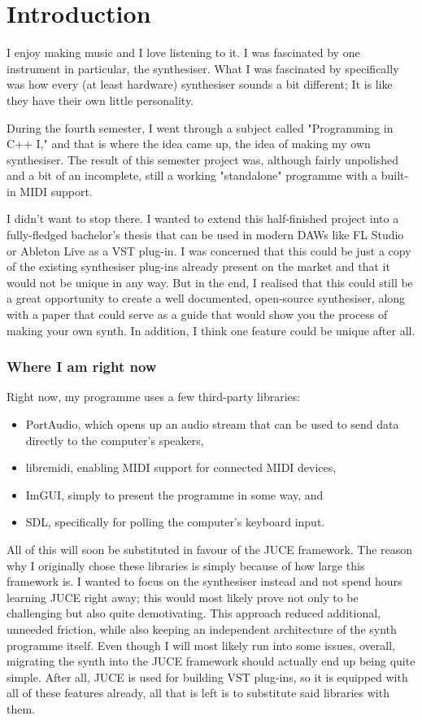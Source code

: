 \chapter{Introduction}
\label{sec:Introduction}

I enjoy making music and I love listening to it. I was fascinated by one instrument in particular, the synthesiser. What I was fascinated by specifically was how every (at least hardware) synthesiser sounds a bit different; It is like they have their own little personality.

During the fourth semester, I went through a subject called "Programming in C++ I," and that is where the idea came up, the idea of making my own synthesiser. The result of this semester project was, although fairly unpolished and a bit of an incomplete, still a working "standalone" programme with a built-in MIDI support.

I didn't want to stop there. I wanted to extend this half-finished project into a fully-fledged bachelor's thesis that can be used in modern DAWs like FL Studio or Ableton Live as a VST plug-in. I was concerned that this could be just a copy of the existing synthesiser plug-ins already present on the market and that it would not be unique in any way. But in the end, I realised that this could still be a great opportunity to create a well documented, open-source synthesiser, along with a paper that could serve as a guide that would show you the process of making your own synth. In addition, I think one feature could be unique after all.

\subsection{Where I am right now}

Right now, my programme uses a few third-party libraries:
\begin{itemize}
    \item PortAudio, which opens up an audio stream that can be used to send data directly to the computer's speakers,
    \item libremidi, enabling MIDI support for connected MIDI devices, 
    \item ImGUI, simply to present the programme in some way, and
    \item SDL, specifically for polling the computer's keyboard input.
\end{itemize}

All of this will soon be substituted in favour of the JUCE framework. The reason why I originally chose these libraries is simply because of how large this framework is. I wanted to focus on the synthesiser instead and not spend hours learning JUCE right away; this would most likely prove not only to be challenging but also quite demotivating. This approach reduced additional, unneeded friction, while also keeping an independent architecture of the synth programme itself. Even though I will most likely run into some issues, overall, migrating the synth into the JUCE framework should actually end up being quite simple. After all, JUCE is used for building VST plug-ins, so it is equipped with all of these features already, all that is left is to substitute said libraries with them.

